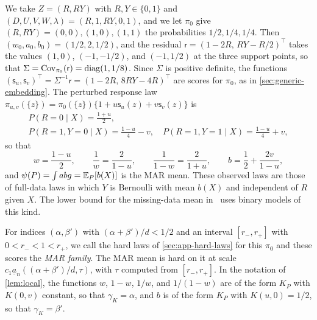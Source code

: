 We take $Z=(R,RY)$ with $R,Y\in\{0,1\}$ and
$(D,U,V,W,\lambda)=(R,1,RY,0,1)$, and we let $\pi_0$ give
$(R,RY)=(0,0),(1,0),(1,1)$ the probabilities $1/2,1/4,1/4$. Then
$(w_0,a_0,b_0)=(1/2,2,1/2)$, and the residual
$\mathsf r=(1-2R,\,RY-R/2)^\top$ takes the values $(1,0)$,
$(-1,-1/2)$, and $(-1,1/2)$ at the three support points, so that
$\Sigma=\operatorname{Cov}_{\pi_0}(\mathsf r)=\operatorname{diag}(1,1/8)$. Since
$\Sigma$ is positive definite, the functions
$(\mathsf s_u,\mathsf s_v)^\top=\Sigma^{-1}\mathsf r=(1-2R,\,8RY-4R)^\top$
are scores for $\pi_0$, as in \cref{sec:generic-embedding}. The perturbed response law
$\pi_{u,v}(\{z\})=\pi_0(\{z\})\{1+u\mathsf s_u(z)+v\mathsf s_v(z)\}$ is
\begin{equation}\label{eq:binary-embedding}
 \begin{gathered}
 P(R=0\mid X)=\frac{1+u}2,\\
 P(R=1,Y=0\mid X)=\frac{1-u}4-v,\quad
 P(R=1,Y=1\mid X)=\frac{1-u}4+v,
 \end{gathered}
\end{equation}
so that
\begin{equation}\label{eq:binary-moments}
 w=\frac{1-u}2,\qquad \frac1w=\frac2{1-u},\qquad
 \frac1{1-w}=\frac2{1+u},\qquad b=\frac12+\frac{2v}{1-u},
\end{equation}
and $\psi(P)=\int abg=\mathbb E_P[b(X)]$ is the MAR mean. These observed laws
are those of full-data laws in which $Y$ is Bernoulli with mean $b(X)$
and independent of $R$ given $X$. The lower bound for the missing-data
mean in~\cite[Section~3]{robins2009} uses binary models of this kind.

For indices $(\alpha,\beta')$ with $(\alpha+\beta')/d<1/2$ and an
interval $[r_-,r_+]$ with $0<r_-<1<r_+$, we call the hard laws of
\cref{sec:app-hard-laws} for this $\pi_0$ and these scores the
\emph{MAR family}. The MAR mean is hard on it at scale
$c_1\underline a_n((\alpha+\beta')/d,\tau)$, with $\tau$ computed from
$[r_-,r_+]$. In the notation of \cref{lem:local}, the functions
$w$, $1-w$, $1/w$, and $1/(1-w)$ are of the form $K_P$ with $K(0,v)$
constant, so that $\gamma_K=\alpha$, and $b$ is of the form $K_P$ with
$K(u,0)=1/2$, so that $\gamma_K=\beta'$.

